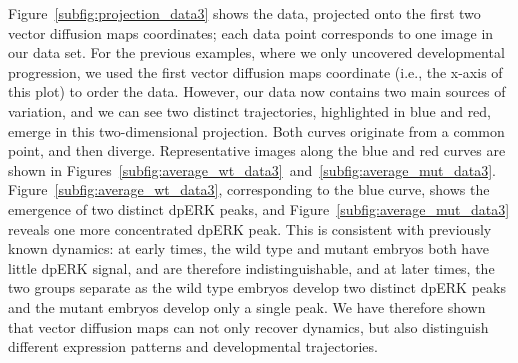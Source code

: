 \documentclass{pnastwo}
\begin{document}
\begin{article}
Figure~\ref{subfig:projection_data3} shows the data, projected onto the first two vector diffusion maps coordinates;
each data point corresponds to one image in our data set.
%
For the previous examples, where we only uncovered developmental progression, we used the first vector diffusion maps coordinate (i.e., the x-axis of this plot) to order the data.
%
However, our data now contains two main sources of variation, and we can see two distinct trajectories, highlighted in blue and red, emerge in this two-dimensional projection.
%
Both curves originate from a common point, and then diverge.
%
Representative images along the blue and red curves are shown in Figures~\ref{subfig:average_wt_data3}~and~\ref{subfig:average_mut_data3}.
%
Figure~\ref{subfig:average_wt_data3}, corresponding to the blue curve, shows the emergence of two distinct dpERK peaks, and Figure~\ref{subfig:average_mut_data3} reveals one more concentrated dpERK peak.
%
This is consistent with previously known dynamics:
at early times, the wild type and mutant embryos both have little dpERK signal, and are therefore indistinguishable, and at later times, the two groups separate as the wild type embryos develop two distinct dpERK peaks and the mutant embryos develop only a single peak.
%
We have therefore shown that vector diffusion maps can not only recover dynamics, but also distinguish different expression patterns and developmental trajectories.


\end{article}
\end{document}
